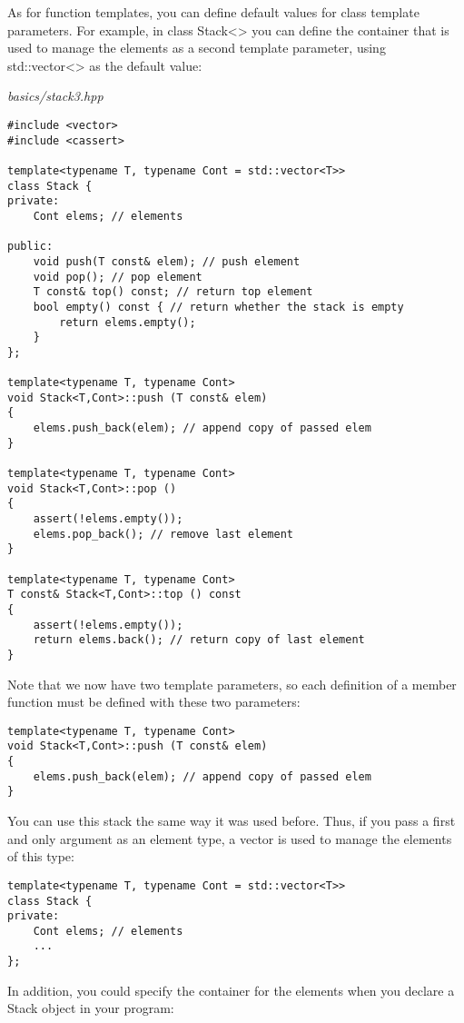 As for function templates, you can define default values for class template parameters. For example, in class Stack<> you can define the container that is used to manage the elements as a second template parameter, using std::vector<> as the default value:

\noindent
\textit{basics/stack3.hpp}
\begin{lstlisting}[style=styleCXX]
#include <vector>
#include <cassert>

template<typename T, typename Cont = std::vector<T>>
class Stack {
private:
	Cont elems; // elements
	
public:
	void push(T const& elem); // push element
	void pop(); // pop element
	T const& top() const; // return top element
	bool empty() const { // return whether the stack is empty
		return elems.empty();
	}
};

template<typename T, typename Cont>
void Stack<T,Cont>::push (T const& elem)
{
	elems.push_back(elem); // append copy of passed elem
}

template<typename T, typename Cont>
void Stack<T,Cont>::pop ()
{
	assert(!elems.empty());
	elems.pop_back(); // remove last element
}

template<typename T, typename Cont>
T const& Stack<T,Cont>::top () const
{
	assert(!elems.empty());
	return elems.back(); // return copy of last element
}
\end{lstlisting}

Note that we now have two template parameters, so each definition of a member function must be defined with these two parameters:

\begin{lstlisting}[style=styleCXX]
template<typename T, typename Cont>
void Stack<T,Cont>::push (T const& elem)
{
	elems.push_back(elem); // append copy of passed elem
}
\end{lstlisting}

You can use this stack the same way it was used before. Thus, if you pass a first and only argument as an element type, a vector is used to manage the elements of this type:

\begin{lstlisting}[style=styleCXX]
template<typename T, typename Cont = std::vector<T>>
class Stack {
private:
	Cont elems; // elements
	...
};
\end{lstlisting}

In addition, you could specify the container for the elements when you declare a Stack object in your program:

